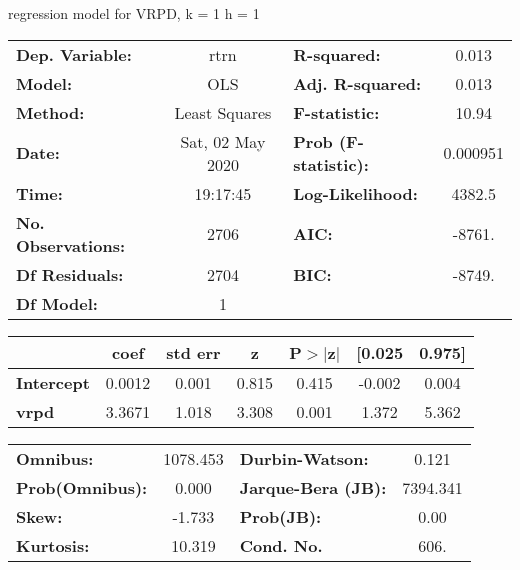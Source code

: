 regression model for VRPD, k = 1 h = 1\begin{center}
\begin{tabular}{lclc}
\toprule
\textbf{Dep. Variable:}    &       rtrn       & \textbf{  R-squared:         } &     0.013   \\
\textbf{Model:}            &       OLS        & \textbf{  Adj. R-squared:    } &     0.013   \\
\textbf{Method:}           &  Least Squares   & \textbf{  F-statistic:       } &     10.94   \\
\textbf{Date:}             & Sat, 02 May 2020 & \textbf{  Prob (F-statistic):} &  0.000951   \\
\textbf{Time:}             &     19:17:45     & \textbf{  Log-Likelihood:    } &    4382.5   \\
\textbf{No. Observations:} &        2706      & \textbf{  AIC:               } &    -8761.   \\
\textbf{Df Residuals:}     &        2704      & \textbf{  BIC:               } &    -8749.   \\
\textbf{Df Model:}         &           1      & \textbf{                     } &             \\
\bottomrule
\end{tabular}
\begin{tabular}{lcccccc}
                   & \textbf{coef} & \textbf{std err} & \textbf{z} & \textbf{P$> |$z$|$} & \textbf{[0.025} & \textbf{0.975]}  \\
\midrule
\textbf{Intercept} &       0.0012  &        0.001     &     0.815  &         0.415        &       -0.002    &        0.004     \\
\textbf{vrpd}      &       3.3671  &        1.018     &     3.308  &         0.001        &        1.372    &        5.362     \\
\bottomrule
\end{tabular}
\begin{tabular}{lclc}
\textbf{Omnibus:}       & 1078.453 & \textbf{  Durbin-Watson:     } &    0.121  \\
\textbf{Prob(Omnibus):} &   0.000  & \textbf{  Jarque-Bera (JB):  } & 7394.341  \\
\textbf{Skew:}          &  -1.733  & \textbf{  Prob(JB):          } &     0.00  \\
\textbf{Kurtosis:}      &  10.319  & \textbf{  Cond. No.          } &     606.  \\
\bottomrule
\end{tabular}
\end{center}


